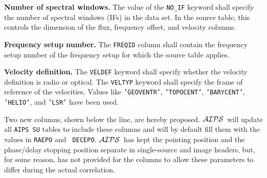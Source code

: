\documentclass[twoside]{article}
\newcommand{\AIPS}{{$\cal AIPS\/$}}
\begin{document}
{\bf Number of spectral windows.} The value of the {\tt NO\_IF}
keyword shall specify the number of spectral windows (IFs) in the data
set.  In the source table, this controls the dimension of the
flux, frequency offset, and velocity columns.

{\bf Frequency setup number.}  The {\tt FREQID} column shall contain
the frequency setup number of the frequency setup for which the source
table applies.

{\bf Velocity definition.} The {\tt VELDEF} keyword shall specify
whether the velocity definition is radio or optical.  The {\tt VELTYP}
keyword shall specify the frame of reference of the velocities.
Values like {\tt 'GEOVENTR'}, {\tt 'TOPOCENT'}, {\tt 'BARYCENT'},
{\tt 'HELIO'}, and {\tt 'LSR'} have been used.

Two new columns, shown below the line, are hereby proposed.  \AIPS\
will update all {\tt AIPS SU} tables to include these columns and will
by default fill them with the values in {\tt RAEPO} and {\tt
  DECEPO}\@.  \AIPS\ has kept the pointing position and the
phase/delay stopping position separate in single-source and image
headers, but, for some reason, has not provided for the columns to
allow these parameters to differ during the actual correlation.
\end{document}
